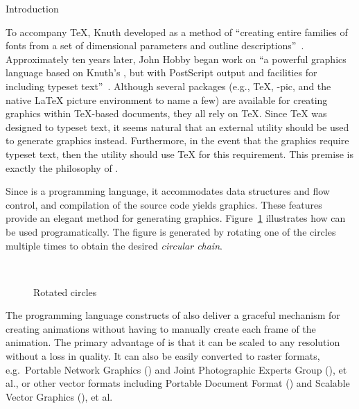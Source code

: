 \begin{section}{Introduction}
\addtocounter{footnote}{1}To accompany \TeX{}, Knuth developed \MF{} as a method of ``creating entire families of fonts from a set of dimensional parameters and outline descriptions''~\cite{beebe:mf}.  Approximately ten years later, John Hobby began work on \MP{}\Dash ``a powerful graphics language based on Knuth's \MF, but with PostScript output and facilities for including typeset text''~\cite{hobby:user}.  Although several packages (e.g., \PiC\TeX, \Xy-pic, and the native \LaTeX{} picture environment to name a few) are available for creating graphics within \TeX-based documents, they all rely on \TeX{}.  Since \TeX{} was designed to typeset text, it seems natural that an external utility should be used to generate graphics instead.  Furthermore, in the event that the graphics require typeset text, then the utility should use \TeX{} for this requirement.  This premise is exactly the philosophy of \MP.

Since \MP{} is a programming language, it accommodates data structures and flow control, and compilation of the \MP{} source code yields \EPS{} graphics.  These features provide an elegant method for generating graphics.  Figure~\ref{fig:circles} illustrates how \MP{} can be used programatically.  The figure is generated by rotating one of the circles multiple times to obtain the desired \textit{circular chain}. 
\begin{figure}[ht]
   \begin{center}\,\end{center}
	\caption{Rotated circles}\label{fig:circles}
\end{figure} 
The programming language constructs of \MP{} also deliver a graceful mechanism for creating animations without having to manually create each frame of the animation.  The primary advantage of \EPS{} is that it can be scaled to any resolution without a loss in quality.  It can also be easily converted to raster formats, e.g.\ Portable Network Graphics (\PNG) and Joint Photographic Experts Group (\JPEG), et al., or other vector formats including Portable Document Format (\PDF) and Scalable Vector Graphics (\SVG), et al.
\end{section}
